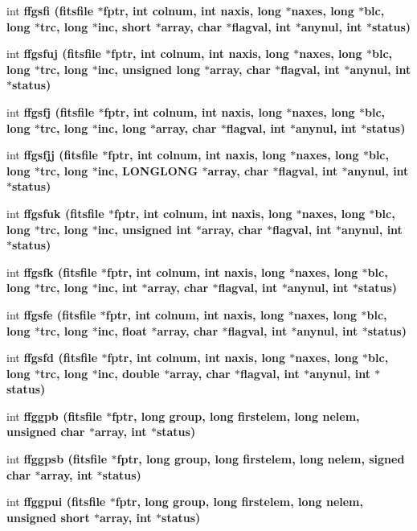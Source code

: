\begin{CompactItemize}
\item 
int \bf{ffgsfi} (\bf{fitsfile} $\ast$fptr, int colnum, int naxis, long $\ast$naxes, long $\ast$blc, long $\ast$trc, long $\ast$inc, short $\ast$array, char $\ast$flagval, int $\ast$anynul, int $\ast$status)
\item 
int \bf{ffgsfuj} (\bf{fitsfile} $\ast$fptr, int colnum, int naxis, long $\ast$naxes, long $\ast$blc, long $\ast$trc, long $\ast$inc, unsigned long $\ast$array, char $\ast$flagval, int $\ast$anynul, int $\ast$status)
\item 
int \bf{ffgsfj} (\bf{fitsfile} $\ast$fptr, int colnum, int naxis, long $\ast$naxes, long $\ast$blc, long $\ast$trc, long $\ast$inc, long $\ast$array, char $\ast$flagval, int $\ast$anynul, int $\ast$status)
\item 
int \bf{ffgsfjj} (\bf{fitsfile} $\ast$fptr, int colnum, int naxis, long $\ast$naxes, long $\ast$blc, long $\ast$trc, long $\ast$inc, \bf{LONGLONG} $\ast$array, char $\ast$flagval, int $\ast$anynul, int $\ast$status)
\item 
int \bf{ffgsfuk} (\bf{fitsfile} $\ast$fptr, int colnum, int naxis, long $\ast$naxes, long $\ast$blc, long $\ast$trc, long $\ast$inc, unsigned int $\ast$array, char $\ast$flagval, int $\ast$anynul, int $\ast$status)
\item 
int \bf{ffgsfk} (\bf{fitsfile} $\ast$fptr, int colnum, int naxis, long $\ast$naxes, long $\ast$blc, long $\ast$trc, long $\ast$inc, int $\ast$array, char $\ast$flagval, int $\ast$anynul, int $\ast$status)
\item 
int \bf{ffgsfe} (\bf{fitsfile} $\ast$fptr, int colnum, int naxis, long $\ast$naxes, long $\ast$blc, long $\ast$trc, long $\ast$inc, float $\ast$array, char $\ast$flagval, int $\ast$anynul, int $\ast$status)
\item 
int \bf{ffgsfd} (\bf{fitsfile} $\ast$fptr, int colnum, int naxis, long $\ast$naxes, long $\ast$blc, long $\ast$trc, long $\ast$inc, double $\ast$array, char $\ast$flagval, int $\ast$anynul, int $\ast$status)
\item 
int \bf{ffggpb} (\bf{fitsfile} $\ast$fptr, long group, long firstelem, long nelem, unsigned char $\ast$array, int $\ast$status)
\item 
int \bf{ffggpsb} (\bf{fitsfile} $\ast$fptr, long group, long firstelem, long nelem, signed char $\ast$array, int $\ast$status)
\item 
int \bf{ffggpui} (\bf{fitsfile} $\ast$fptr, long group, long firstelem, long nelem, unsigned short $\ast$array, int $\ast$status)
\item 

\end{CompactItemize}
